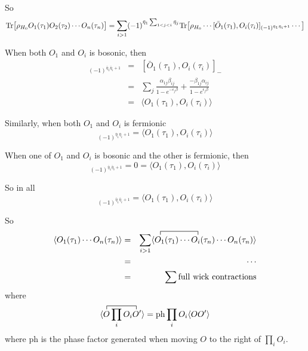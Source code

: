 \documentclass[12pt]{book}
\begin{document}
	So
	\begin{equation}
		{\rm Tr}\big[\rho_{H_0}O_1(\tau_1)O_2(\tau_2)\cdots O_n(\tau_n)\big]=\sum_{i>1}(-1)^{\bar\eta_1\sum_{1<j<i}\bar\eta_j}{\rm Tr}\big[\rho_{H_0}\cdots[\bar O_1(\tau_1),O_i(\tau_i)]_{(-1)^{\bar\eta_1\bar\eta_i+1}}\cdots\big]
	\end{equation}
	
	When both $O_1$ and $O_i$ is bosonic, then
	\begin{eqnarray}
		[\bar O_1(\tau_1),O_i(\tau_i)]_{(-1)^{\bar\eta_1\bar\eta_i+1}}&=&[\bar O_1(\tau_1),O_i(\tau_i)]_-\\
		&=&\sum_j\frac{\alpha_{1j}\beta_{ij}}{1-e^{-\epsilon_j\beta}}+\frac{-\beta_{1j}\alpha_{ij}}{1-e^{\epsilon_j\beta}}\\
		&=&\langle O_1(\tau_1),O_i(\tau_i)\rangle
	\end{eqnarray}
	
	Similarly, when both $O_1$ and $O_i$ is fermionic
	\begin{equation}
		[\bar O_1(\tau_1),O_i(\tau_i)]_{(-1)^{\bar\eta_1\bar\eta_i+1}}=\langle O_1(\tau_1),O_i(\tau_i)\rangle
	\end{equation}
	
	When one of $O_1$ and $O_i$ is bosonic and the other is fermionic, then
	\begin{equation}
		[\bar O_1(\tau_1),O_i(\tau_i)]_{(-1)^{\bar\eta_1\bar\eta_i+1}}=0=\langle O_1(\tau_1),O_i(\tau_i)\rangle
	\end{equation}
	
	So in all
	\begin{equation}
		[\bar O_1(\tau_1),O_i(\tau_i)]_{(-1)^{\bar\eta_1\bar\eta_i+1}}=\langle O_1(\tau_1),O_i(\tau_i)\rangle
	\end{equation}
	
	So
	\begin{eqnarray}
		\contraction{\langle O_1(\tau_1)\cdots O_n(\tau_n)\rangle\quad=\sum_{i>1}\langle}{O}{1(\tau_1)\cdots}{O}
		\langle O_1(\tau_1)\cdots O_n(\tau_n)\rangle&=&\sum_{i>1}\langle O_1(\tau_1)\cdots O_i(\tau_n)\cdots O_n(\tau_n)\rangle\\
		&=&\cdots\\
		&=&\sum{\rm full\ wick\ contractions}
	\end{eqnarray}
	where
	\begin{equation}
		\contraction{\langle}{O}{\prod_iO_i}{O}
		\langle O\prod_iO_iO'\rangle={\rm ph}\prod_iO_i\langle O O'\rangle\\
	\end{equation}
	where ph is the phase factor generated when moving $O$ to the right of $\prod_iO_i$.
	
\end{document}
